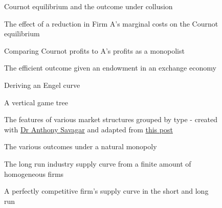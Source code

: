 \documentclass{article}
\begin{document}
\begin{figure}[H]
    \centering
    
    \caption{Cournot equilibrium and the outcome under collusion}
    \label{fig:10}
\end{figure}
\begin{figure}[H]
    \centering
    
    \caption{The effect of a reduction in Firm A's marginal costs on the Cournot equilibrium}
    \label{fig:11}
\end{figure}
\begin{figure}[H]
    \centering
    
    \caption{Comparing Cournot profits to A's profits as a monopolist}
    \label{fig:12}
\end{figure}
\begin{figure}[H]
    \centering
    
    \caption{The efficient outcome given an endowment in an exchange economy}
    \label{fig:13}
\end{figure}
\begin{figure}[H]
    \centering
    
    \caption{Deriving an Engel curve}
    \label{fig:14}
\end{figure}
\begin{figure}[H]
    \centering
    
    \caption{A vertical game tree}
    \label{fig:15}
\end{figure}
\begin{figure}[H]
    \centering
    
    \caption{The features of various market structures grouped by type - created with \href{https://github.com/asavagar}{Dr Anthony Savagar} and adapted from \href{https://tex.stackexchange.com/questions/78846/creating-thicker-tikz-mindmap-connectors}{this post}}
    \label{fig:16}
\end{figure}
\begin{figure}[H]
    \centering
    
    \caption{The various outcomes under a natural monopoly}
    \label{fig:17}
\end{figure}
\begin{figure}[H]
    \centering
    
    \caption{The long run industry supply curve from a finite amount of homogeneous firms}
    \label{fig:18}
\end{figure}
\begin{figure}[H]
    \centering
    
    \caption{A perfectly competitive firm's supply curve in the short and long run}
    \label{fig:19}
\end{figure}
\end{document}
